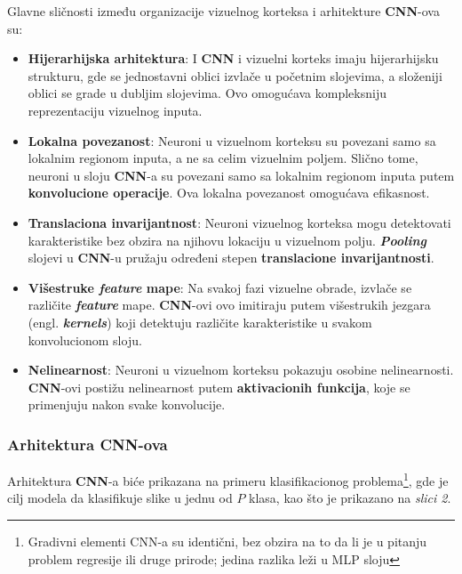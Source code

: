\documentclass[12pt]{article}
\begin{document}
   Glavne sličnosti \cite{human_visual_cortex} između organizacije vizuelnog korteksa i arhitekture \textbf{CNN}-ova su:
   \begin{itemize}
   \item \textbf{Hijerarhijska arhitektura}: I \textbf{CNN} i vizuelni korteks imaju hijerarhijsku strukturu, 
   gde se jednostavni oblici izvlače u početnim slojevima, a složeniji oblici se grade u dubljim slojevima. 
   Ovo omogućava kompleksniju reprezentaciju vizuelnog inputa.
   \item \textbf{Lokalna povezanost}: Neuroni u vizuelnom korteksu su povezani samo sa 
   lokalnim regionom inputa, a ne sa celim vizuelnim poljem. Slično tome, neuroni 
   u sloju \textbf{CNN}-a su povezani samo sa lokalnim regionom inputa putem \textbf{konvolucione operacije}. 
   Ova lokalna povezanost omogućava efikasnost.
   \item \textbf{Translaciona invarijantnost}: Neuroni vizuelnog korteksa mogu detektovati karakteristike
    bez obzira na njihovu lokaciju u vizuelnom polju. \textbf{\textit{Pooling}} slojevi u \textbf{CNN}-u pružaju određeni 
    stepen \textbf{translacione invarijantnosti}.
    \item \textbf{Višestruke \textit{feature} mape}: Na svakoj fazi vizuelne obrade, izvlače se različite \textbf{\textit{feature}} mape.
    \textbf{CNN}-ovi ovo imitiraju putem višestrukih jezgara (engl. \textbf{\textit{kernels}}) koji detektuju različite karakteristike
      u svakom konvolucionom sloju.
   \item \textbf{Nelinearnost}: Neuroni u vizuelnom korteksu pokazuju osobine nelinearnosti. 
   \textbf{CNN}-ovi postižu nelinearnost putem \textbf{aktivacionih funkcija}, koje se primenjuju nakon svake konvolucije.
   
   \end{itemize}
   
   \newpage

   \subsubsection{Arhitektura \textbf{CNN}-ova}
   Arhitektura \textbf{CNN}-a biće prikazana na primeru klasifikacionog
    problema\footnote{Gradivni elementi CNN-a su identični, bez obzira na to
     da li je u pitanju problem regresije ili druge prirode; jedina razlika leži u MLP sloju}, 
     gde je cilj modela da klasifikuje slike u jednu od $P$ klasa, kao što je prikazano na \textit{slici 2}.
\end{document}
